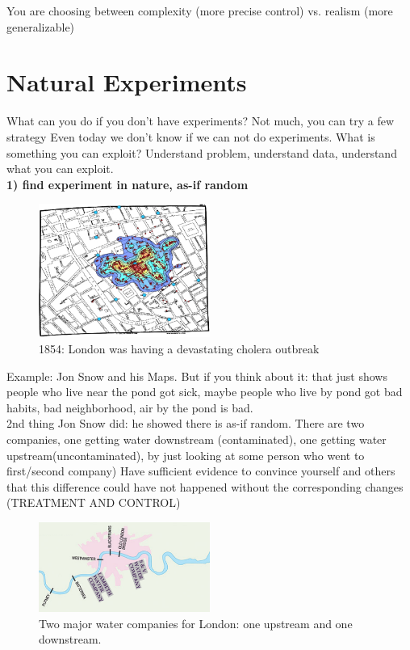 You are choosing between complexity (more precise control) vs. realism (more generalizable)

\section{Natural Experiments}
What can you do if you don’t have experiments? Not much, you can try a few strategy
Even today we don’t know if we can not do experiments. What is something you can exploit? Understand problem, understand data, understand what you can exploit.\\

\textbf{1) find experiment in nature, as-if random}\\

\begin{figure}[ht]
  \begin{center}
    \includegraphics[width=0.5\textwidth]{figures/3.png}
    \caption{
      1854: London was having a devastating cholera outbreak}
    \label{fig:example_figure}
  \end{center}
\end{figure} 
\noindent Example: Jon Snow and his Maps.
But if you think about it: that just shows people who live near the pond got sick, maybe people who live by pond got bad habits, bad neighborhood, air by the pond is bad.\\
2nd thing Jon Snow did: he showed there is as-if random. There are two companies, one getting water downstream (contaminated), one getting water upstream(uncontaminated), by just looking at some person who went to first/second company) Have sufficient evidence to convince yourself and others that this difference could have not happened without the corresponding changes 
(TREATMENT AND CONTROL)
\begin{figure}[ht]
  \begin{center}
    \includegraphics[width=0.5\textwidth]{figures/4.png}
    \caption{
      Two major water companies for London: one upstream and one downstream.}
    \label{fig:example_figure}
  \end{center}
\end{figure} 

